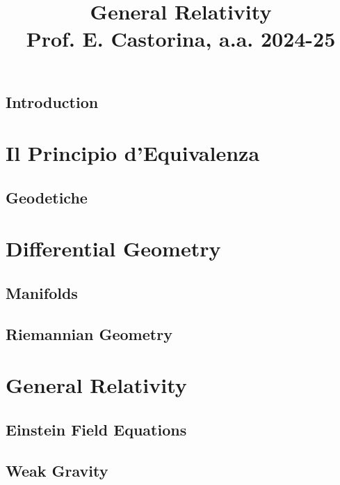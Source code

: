 \documentclass[a4paper, 12pt, openany]{book}
\title{\Huge\textbf{General Relativity} \\ \large Prof. E. Castorina, a.a. 2024-25}
\begin{document}
\frontmatter

\maketitle

\tableofcontents
\pagestyle{contents}

\mainmatter

\chapter*{Introduction}
\pagestyle{introd}



\part{Il Principio d'Equivalenza}
\pagestyle{body}

\chapter{Geodetiche}


\part{Differential Geometry}

\chapter{Manifolds}


\chapter{Riemannian Geometry}


\part{General Relativity}

\chapter{Einstein Field Equations}


\chapter{Weak Gravity}

\end{document}
